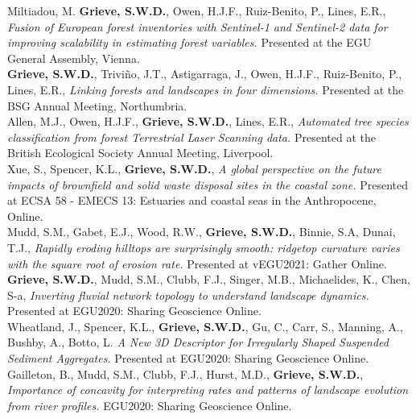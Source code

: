 \documentclass[10pt, a4paper]{article}
\newcommand{\student}{\textbf{\textsuperscript{\textdagger}}}
\newcommand{\years}[1]{\marginnote{\scriptsize #1}}
\begin{document}
\years{2023} Miltiadou, M. \textbf{Grieve, S.W.D.}, Owen, H.J.F., Ruiz-Benito, P., Lines, E.R., \textit{Fusion of European forest inventories with Sentinel-1 and Sentinel-2 data for improving scalability in estimating forest variables.} Presented at the EGU General Assembly, Vienna.\\[0.05cm]

\years{2022}\textbf{Grieve, S.W.D.}, Trivi\~{n}o, J.T., Astigarraga, J., Owen, H.J.F., Ruiz-Benito, P., Lines, E.R., \textit{Linking forests and landscapes in four dimensions.} Presented at the BSG Annual Meeting, Northumbria.\\[0.05cm]

\years{2021}Allen, M.J.\student, Owen, H.J.F., \textbf{Grieve, S.W.D.}, Lines, E.R., \textit{Automated tree species classification from forest Terrestrial Laser Scanning data.} Presented at the British Ecological Society Annual Meeting, Liverpool.\\[0.05cm]

\years{2021}Xue, S.\student, Spencer, K.L., \textbf{Grieve, S.W.D.}, \textit{A global perspective on the future impacts of brownfield and solid waste disposal sites in the coastal zone.} Presented at ECSA 58 - EMECS 13: Estuaries and coastal seas in the Anthropocene, Online.\\[0.05cm]

\years{2021}Mudd, S.M., Gabet, E.J., Wood, R.W., \textbf{Grieve, S.W.D.}, Binnie, S.A, Dunai, T.J., \textit{Rapidly eroding hilltops are surprisingly smooth: ridgetop curvature varies with the square root of erosion rate.} Presented at vEGU2021: Gather Online.\\[0.05cm]

\years{2020}\textbf{Grieve, S.W.D.}, Mudd, S.M., Clubb, F.J., Singer, M.B., Michaelides, K., Chen, S-a, \textit{Inverting fluvial network topology to understand landscape dynamics.} Presented at EGU2020: Sharing Geoscience Online.\\[0.05cm]

\years{2020}Wheatland, J., Spencer, K.L., \textbf{Grieve, S.W.D.}, Gu, C., Carr, S., Manning, A., Bushby, A., Botto, L. \textit{A New 3D Descriptor for Irregularly Shaped Suspended Sediment Aggregates.} Presented at EGU2020: Sharing Geoscience Online.\\[0.05cm]

\years{2020}Gailleton, B., Mudd, S.M., Clubb, F.J., Hurst, M.D., \textbf{Grieve, S.W.D.}, \textit{Importance of concavity for interpreting rates and patterns of landscape evolution from river profiles.} EGU2020: Sharing Geoscience Online.\\[0.05cm]
\end{document}
